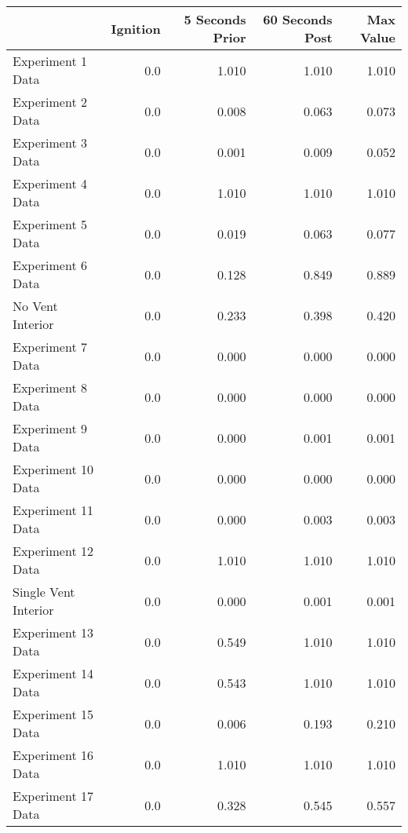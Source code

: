 \begin{tabular}{lrrrr}
\toprule
{} &  Ignition &  5 Seconds Prior &  60 Seconds Post &  Max Value \\
\midrule
Experiment 1 Data    &       0.0 &            1.010 &            1.010 &      1.010 \\
Experiment 2 Data    &       0.0 &            0.008 &            0.063 &      0.073 \\
Experiment 3 Data    &       0.0 &            0.001 &            0.009 &      0.052 \\
Experiment 4 Data    &       0.0 &            1.010 &            1.010 &      1.010 \\
Experiment 5 Data    &       0.0 &            0.019 &            0.063 &      0.077 \\
Experiment 6 Data    &       0.0 &            0.128 &            0.849 &      0.889 \\
No Vent Interior     &       0.0 &            0.233 &            0.398 &      0.420 \\
Experiment 7 Data    &       0.0 &            0.000 &            0.000 &      0.000 \\
Experiment 8 Data    &       0.0 &            0.000 &            0.000 &      0.000 \\
Experiment 9 Data    &       0.0 &            0.000 &            0.001 &      0.001 \\
Experiment 10 Data   &       0.0 &            0.000 &            0.000 &      0.000 \\
Experiment 11 Data   &       0.0 &            0.000 &            0.003 &      0.003 \\
Experiment 12 Data   &       0.0 &            1.010 &            1.010 &      1.010 \\
Single Vent Interior &       0.0 &            0.000 &            0.001 &      0.001 \\
Experiment 13 Data   &       0.0 &            0.549 &            1.010 &      1.010 \\
Experiment 14 Data   &       0.0 &            0.543 &            1.010 &      1.010 \\
Experiment 15 Data   &       0.0 &            0.006 &            0.193 &      0.210 \\
Experiment 16 Data   &       0.0 &            1.010 &            1.010 &      1.010 \\
Experiment 17 Data   &       0.0 &            0.328 &            0.545 &      0.557 \\

\end{tabular}
